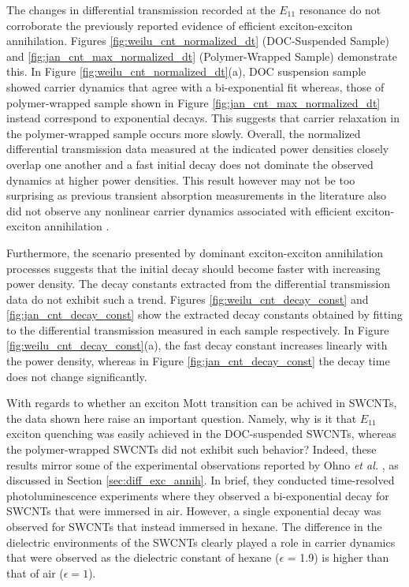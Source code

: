The changes in differential transmission recorded at the $E_{11}$ resonance do not corroborate the previously reported evidence of efficient exciton-exciton annihilation. Figures \ref{fig:weilu_cnt_normalized_dt} (DOC-Suspended Sample) and \ref{fig:jan_cnt_max_normalized_dt} (Polymer-Wrapped Sample) demonstrate this. In Figure \ref{fig:weilu_cnt_normalized_dt}(a), DOC suspension sample showed carrier dynamics that agree with a bi-exponential fit whereas, those of polymer-wrapped sample shown in Figure \ref{fig:jan_cnt_max_normalized_dt} instead correspond to exponential decays. This suggests that carrier relaxation in the polymer-wrapped sample occurs more slowly. Overall, the normalized differential transmission data measured at the indicated power densities closely overlap one another and a fast initial decay does not dominate the observed dynamics at higher power densities. This result however may not be too surprising as previous transient absorption measurements in the literature also did not observe any nonlinear carrier dynamics associated with efficient exciton-exciton annihilation \cite{ostojic2004interband, manzoni2005intersubband, ma2005femtosecond, luer2009size}.

Furthermore, the scenario presented by dominant exciton-exciton annihilation processes suggests that the initial decay should become faster with increasing power density. The decay constants extracted from the differential transmission data do not exhibit such a trend. Figures \ref{fig:weilu_cnt_decay_const} and \ref{fig:jan_cnt_decay_const} show the extracted decay constants obtained by fitting to the differential transmission measured in each sample respectively. In Figure \ref{fig:weilu_cnt_decay_const}(a), the fast decay constant increases linearly with the power density, whereas in Figure \ref{fig:jan_cnt_decay_const} the decay time does not change significantly.

With regards to whether an exciton Mott transition can be achived in SWCNTs, the data shown here raise an important question. Namely, why is it that $E_{11}$ exciton quenching was easily achieved in the DOC-suspended SWCNTs, whereas the polymer-wrapped SWCNTs did not exhibit such behavior? Indeed, these results mirror some of the experimental observations reported by Ohno \textit{et al.} \cite{ohno2007excitonic}, as discussed in Section \ref{sec:diff_exc_annih}. In brief, they conducted time-resolved photoluminescence experiments where they observed a bi-exponential decay for SWCNTs that were immersed in air. However, a single exponential decay was observed for SWCNTs that instead immersed in hexane. The difference in the dielectric environments of the SWCNTs clearly played a role in carrier dynamics that were observed as the dielectric constant of hexane ($\epsilon$ = 1.9) is higher than that of air ($\epsilon = 1$).

